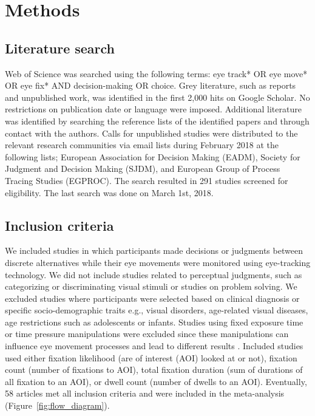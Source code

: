 \documentclass[english,natbib,man,floatsintext]{apa6}
\begin{document}
\section{Methods}

\subsection{Literature search}

Web of Science was searched using the following terms: eye track* OR eye move* OR eye fix* AND decision-making OR choice. Grey literature, such as reports and unpublished work, was identified in the first 2,000 hits on Google Scholar. No restrictions on publication date or language were imposed. Additional literature was identified by searching the reference lists of the identified papers and through contact with the authors. Calls for unpublished studies were distributed to the relevant research communities via email lists during February 2018 at the following lists; European Association for Decision Making (EADM), Society for Judgment and Decision Making (SJDM), and European Group of Process Tracing Studies (EGPROC). The search resulted in 291 studies screened for eligibility. The last search was done on March 1st, 2018.


\subsection{Inclusion criteria}

We included studies in which participants made decisions or judgments between discrete alternatives while their eye movements were monitored using eye-tracking technology. We did not include studies related to perceptual judgments, such as categorizing or discriminating visual stimuli or studies on problem solving. We excluded studies where participants were selected based on clinical diagnosis or specific socio-demographic traits e.g., visual disorders, age-related visual diseases, age restrictions such as adolescents or infants. Studies using fixed exposure time or time pressure manipulations were excluded since these manipulations can influence eye movement processes \citep{orquin2018a} and lead to different results \citep{simola2019a}. Included studies used either fixation likelihood (are of interest (AOI) looked at or not), fixation count (number of fixations to AOI), total fixation duration (sum of durations of all fixation to an AOI), or dwell count (number of dwells to an AOI). Eventually, 58 articles met all inclusion criteria and were included in the meta-analysis (Figure~\ref{fig:flow_diagram}).
\end{document}
